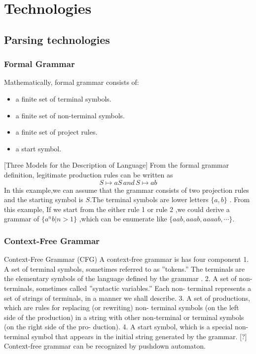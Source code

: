 \chapter{Technologies}
\section{Parsing technologies}
\subsection{Formal Grammar}

Mathematically, formal grammar consists of:
\begin{itemize}
\item a finite set of terminal symbols.
\item a finite set of non-terminal symbols.
\item a finite set of project rules.
\item a start symbol.
\end{itemize} \cite{aho1986compilers}
[Three Models for the Description of Language]
From the formal grammar definition, legitimate production rules can be written as 
 \[ S \mapsto aS  \,and \, S \mapsto ab \]
In this example,we can assume that the grammar consists of two projection rules and the starting symbol is $ S $.The terminal symbols are lower letters $ \{a ,b\} $ . From this example, If we start from the either rule 1 or rule 2 ,we could derive a  grammar of $ \{ a^n b | n>1  \}$ ,which can be enumerate like $ \{aab,aaab,aaaab,\cdots \} $.




\subsection{Context-Free Grammar}
Context-Free Grammar (CFG)
A context-free grammar is has four component
1. A set of terminal symbols, sometimes referred to as ”tokens.” The
terminals are the elementary symbols of the language defined by the
grammar .
2. A set of non-terminals, sometimes called ”syntactic variables.” Each
non- terminal represents a set of strings of terminals, in a manner we
shall describe.
3. A set of productions, which are rules for replacing (or rewriting) non-
terminal symbols (on the left side of the production) in a string with
other non-terminal or terminal symbols (on the right side of the pro-
duction).
4. A start symbol, which is a special non-terminal symbol that appears
in the initial string generated by the grammar.
[?] Context-free grammar can be recognized by pushdown automaton.




